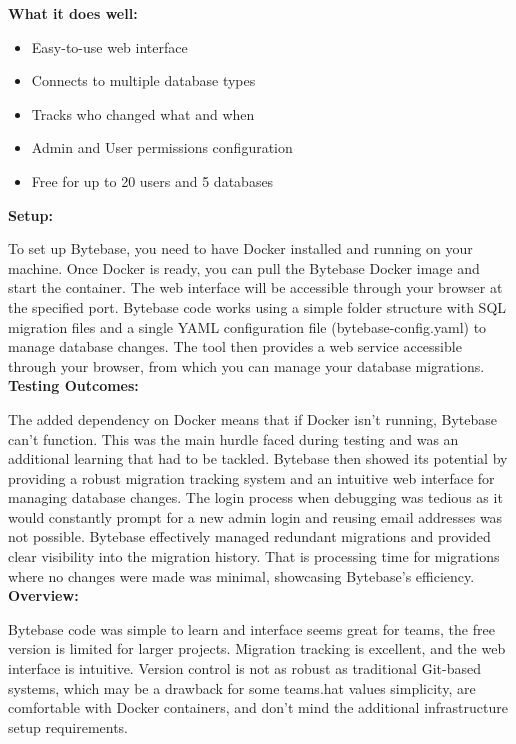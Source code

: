 \documentclass[11pt,a4paper]{article}
\begin{document}
\textbf{What it does well:}
\begin{itemize}
    \item Easy-to-use web interface
    \item Connects to multiple database types
    \item Tracks who changed what and when
    \item Admin and User permissions configuration
    \item Free for up to 20 users and 5 databases
\end{itemize}

\textbf{Setup:}

To set up Bytebase, you need to have Docker installed and running on your machine.
Once Docker is ready, you can pull the Bytebase Docker image and start the container.
The web interface will be accessible through your browser at the specified port.
Bytebase code works using a simple folder structure with SQL migration files and a single YAML configuration file (bytebase-config.yaml) to manage database changes.
The tool then provides a web service accessible through your browser, from which you can manage your database migrations.\\

\textbf{Testing Outcomes:}

The added dependency on Docker means that if Docker isn't running, Bytebase can't function.
This was the main hurdle faced during testing and was an additional learning that had to be tackled.
Bytebase then showed its potential by providing a robust migration tracking system and an intuitive web interface for managing database changes.
The login process when debugging was tedious as it would constantly prompt for a new admin login and reusing email addresses was not possible.
Bytebase effectively managed redundant migrations and provided clear visibility into the migration history.
That is processing time for migrations where no changes were made was minimal, showcasing Bytebase's efficiency.\\

\textbf{Overview:}

Bytebase code was simple to learn and interface seems great for teams, the free version is limited for larger projects.
Migration tracking is excellent, and the web interface is intuitive.
Version control is not as robust as traditional Git-based systems, which may be a drawback for some teams.hat values simplicity, are comfortable with Docker containers, and don't mind the additional infrastructure setup requirements.\\
\end{document}
